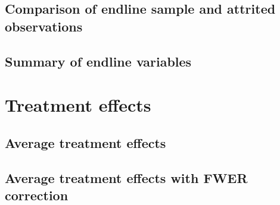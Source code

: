 \documentclass[11pt]{article}
\begin{document}
    	
    	
    	
    	
        

	\clearpage

    \subsection{Comparison of endline sample and attrited observations}

    	
    	
    	
    	
    	
        

    \clearpage

	\subsection{Summary of endline variables}

		
		
		
		
		
		

	\clearpage

\section{Treatment effects}

	\subsection{Average treatment effects}

		
        
        
		
		
		
		
		
		

	\clearpage

    \subsection{Average treatment effects with FWER correction}
\end{document}
